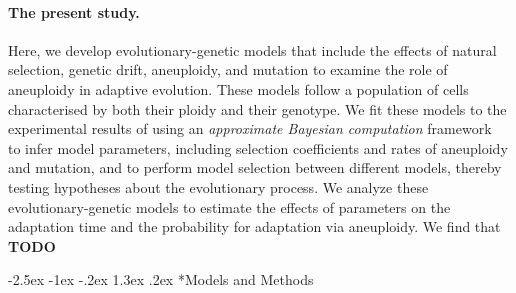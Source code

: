 \documentclass[12pt]{extarticle}
\makeatletter
\renewcommand\section{\@startsection {section}{1}{\z@}%
     {-2.5ex \@plus -1ex \@minus -.2ex}%
     {1.3ex \@plus.2ex}%
    {\Large\bfseries}}
\makeatother
\begin{document}
\paragraph*{The present study.}
Here, we develop evolutionary-genetic models that include the effects of natural selection, genetic drift, aneuploidy, and mutation to examine the role of aneuploidy in adaptive evolution.
These models follow a population of cells characterised by both their ploidy and their genotype.
We fit these models to the experimental results of \citet{Yona2012} using an \emph{approximate Bayesian computation} framework~\citep{Sisson2009} to infer model parameters, including selection coefficients and rates of aneuploidy and mutation, and to perform model selection between different models, thereby testing hypotheses about the evolutionary process. 
We analyze these evolutionary-genetic models to estimate the effects of parameters on the adaptation time and the probability for adaptation via aneuploidy.
We find that \textbf{TODO} %

\pagebreak
\section*{Models and Methods}
\end{document}

